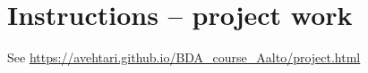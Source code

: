 \documentclass[a4paper,11pt]{article}
\begin{document}
\thispagestyle{empty}

\section*{Instructions -- project work}


See \url{https://avehtari.github.io/BDA_course_Aalto/project.html}

  
  
\end{document}
